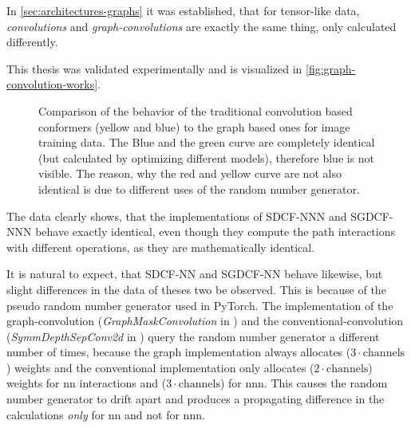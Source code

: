 In \autoref{sec:architectures-graphs} it was established, that for tensor-like data, \emph{convolutions} and \emph{graph-convolutions} are exactly the same thing, only calculated differently.

This thesis was validated experimentally and is visualized in \autoref{fig:graph-convolution-works}.

\begin{figure}[htbp]
    \centering
    \caption{
        Comparison of the behavior of the traditional convolution based conformers (yellow and blue) to the graph based ones for image training data.
        The Blue and the green curve are completely identical (but calculated by optimizing different models), therefore blue is not visible.
        The reason, why the red and yellow curve are not also identical is due to different uses of the random number generator.
    }
    \label{fig:graph-convolution-works}
\end{figure}

The data clearly shows, that the implementations of SDCF-NNN and SGDCF-NNN behave exactly identical, even though they compute the path interactions with different operations, as they are mathematically identical.

It is natural to expect, that SDCF-NN and SGDCF-NN behave likewise, but slight differences in the data of theses two be observed.
This is because of the pseudo random number generator used in PyTorch.
The implementation of the graph-convolution (\emph{GraphMaskConvolution} in \cite{selfComputerScience} ) and the conventional-convolution (\emph{SymmDepthSepConv2d} in \cite{selfComputerScience} ) query the random number generator a different number of times, because the graph implementation always allocates ($3 \cdot \mathrm{channels}$) weights and the conventional implementation only allocates ($2 \cdot \mathrm{channels}$) weights for nn interactions and ($3 \cdot \mathrm{channels}$) for nnn.
This causes the random number generator to drift apart and produces a propagating difference in the calculations \emph{only} for nn and not for nnn.

